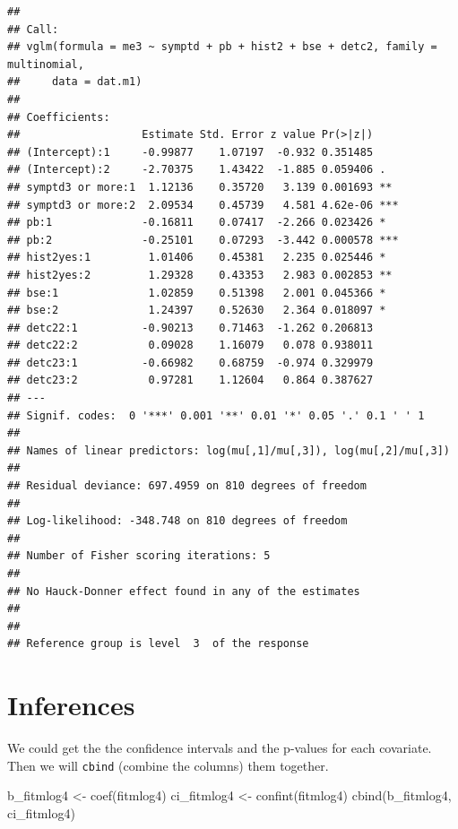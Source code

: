 \documentclass[
  10pt,
]{krantz}
\newenvironment{Shaded}{\begin{snugshade}}{\end{snugshade}}
\newcommand{\FunctionTok}[1]{\textcolor[rgb]{0.00,0.00,0.00}{#1}}
\newcommand{\NormalTok}[1]{#1}
\newcommand{\OtherTok}[1]{\textcolor[rgb]{0.56,0.35,0.01}{#1}}
\begin{document}
\begin{verbatim}
## 
## Call:
## vglm(formula = me3 ~ symptd + pb + hist2 + bse + detc2, family = multinomial, 
##     data = dat.m1)
## 
## Coefficients: 
##                   Estimate Std. Error z value Pr(>|z|)    
## (Intercept):1     -0.99877    1.07197  -0.932 0.351485    
## (Intercept):2     -2.70375    1.43422  -1.885 0.059406 .  
## symptd3 or more:1  1.12136    0.35720   3.139 0.001693 ** 
## symptd3 or more:2  2.09534    0.45739   4.581 4.62e-06 ***
## pb:1              -0.16811    0.07417  -2.266 0.023426 *  
## pb:2              -0.25101    0.07293  -3.442 0.000578 ***
## hist2yes:1         1.01406    0.45381   2.235 0.025446 *  
## hist2yes:2         1.29328    0.43353   2.983 0.002853 ** 
## bse:1              1.02859    0.51398   2.001 0.045366 *  
## bse:2              1.24397    0.52630   2.364 0.018097 *  
## detc22:1          -0.90213    0.71463  -1.262 0.206813    
## detc22:2           0.09028    1.16079   0.078 0.938011    
## detc23:1          -0.66982    0.68759  -0.974 0.329979    
## detc23:2           0.97281    1.12604   0.864 0.387627    
## ---
## Signif. codes:  0 '***' 0.001 '**' 0.01 '*' 0.05 '.' 0.1 ' ' 1
## 
## Names of linear predictors: log(mu[,1]/mu[,3]), log(mu[,2]/mu[,3])
## 
## Residual deviance: 697.4959 on 810 degrees of freedom
## 
## Log-likelihood: -348.748 on 810 degrees of freedom
## 
## Number of Fisher scoring iterations: 5 
## 
## No Hauck-Donner effect found in any of the estimates
## 
## 
## Reference group is level  3  of the response
\end{verbatim}

\hypertarget{inferences-1}{%
\section{Inferences}\label{inferences-1}}

We could get the the confidence intervals and the p-values for each covariate. Then we will \texttt{cbind} (combine the columns) them together.

\begin{Shaded}
\begin{Highlighting}[]
\NormalTok{b\_fitmlog4 }\OtherTok{\textless{}{-}} \FunctionTok{coef}\NormalTok{(fitmlog4)}
\NormalTok{ci\_fitmlog4 }\OtherTok{\textless{}{-}} \FunctionTok{confint}\NormalTok{(fitmlog4)}
\FunctionTok{cbind}\NormalTok{(b\_fitmlog4, ci\_fitmlog4)}
\end{Highlighting}
\end{Shaded}
\end{document}
